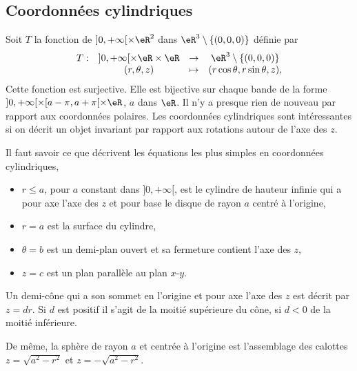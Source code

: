 \subsection{Coordonnées cylindriques}
Soit $T$ la fonction de $]0, +\infty[\times \eR^2$ dans $\eR^3\setminus\{(0,0,0)\}$ définie par
\begin{equation}
  \begin{array}{lccc}
    T: &]0, +\infty[\times \eR\times \eR & \to & \eR^3\setminus\{(0,0,0)\}\\
 & (r, \theta, z)&\mapsto& (r\cos \theta, r \sin \theta, z),
  \end{array}
\end{equation}
Cette fonction est surjective. Elle est bijective sur chaque bande de la forme  $]0, +\infty[\times [a-\pi,a+\pi[\times \eR$, $a$ dans $\eR$. Il n'y a presque rien de nouveau par rapport aux coordonnées polaires. Les coordonnées  cylindriques sont intéressantes si on décrit un objet invariant par rapport aux rotations autour de l'axe des $z$. 

\begin{example}
Il faut savoir ce que décrivent les équations les plus simples en coordonnées cylindriques, 
\begin{itemize}
\item $r\leq a$, pour $a$ constant dans  $]0, +\infty[$, est le cylindre de hauteur infinie qui a pour axe l'axe des $z$ et pour base le disque de rayon $a$ centré à l'origine, 
\item $r= a$ est  la surface du cylindre,
\item $\theta = b$ est un demi-plan ouvert et sa fermeture contient l'axe des $z$,
\item $z=c$ est un plan parallèle au plan $x$-$y$. 
\end{itemize}
\end{example}

\begin{example}
  Un demi-cône qui a  son sommet en l'origine et  pour axe l'axe des $z$ est décrit par $z=d r$.  Si $d$ est positif  il s'agit  de la moitié supérieure du cône, si $d<0$ de la moitié inférieure.
\end{example}

\begin{example}
 De même,  la sphère de rayon $a$ et centrée à l'origine est l'assemblage des calottes $z=\sqrt{a^2-r^2}$ et $z=-\sqrt{a^2-r^2}$. 
\end{example}
